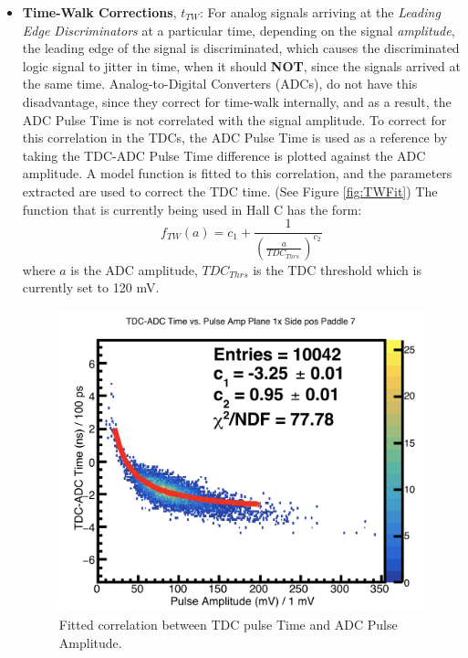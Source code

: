 \documentclass[14pt]{article}
\begin{document}
\begin{itemize}
\item \textbf{Time-Walk Corrections}, $t_{TW}$: For analog signals arriving at the \textit{Leading Edge Discriminators}
  at a particular time, depending on the signal \textit{amplitude}, the leading edge of the signal is discriminated,
  which causes the discriminated logic signal to jitter in time, when it should \textbf{NOT}, since the signals arrived at the
  same time. Analog-to-Digital Converters (ADCs), do not have this disadvantage, since they correct for time-walk internally,
  and as a result, the ADC Pulse Time is not correlated with the signal amplitude. To correct for this correlation in the TDCs,
  the ADC Pulse Time is used as a reference by taking the TDC-ADC Pulse Time difference is plotted against the ADC amplitude. A model
  function is fitted to this correlation, and the parameters extracted are used to correct the TDC time. (See Figure \ref{fig:TWFit}) The function that is currently
  being used in Hall C has the form:
  \begin{equation}
    f_{TW}(a) = c_{1} + \frac{1}{(\frac{a}{TDC_{Thrs.}})^{c_{2}}}
  \end{equation}
  where $a$ is the ADC amplitude,  $TDC_{Thrs}$ is the TDC threshold which is currently set to 120 mV. \newpage
\begin{figure}[H]
  \captionsetup{justification=raggedright,singlelinecheck=false}
    \includegraphics[scale=0.35]{1x7-_TWFit.png}
    \caption{Fitted correlation between TDC pulse Time and ADC Pulse Amplitude.}

\end{figure}
\end{itemize}
\end{document}
